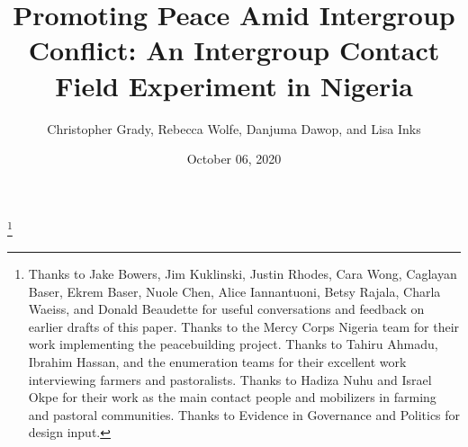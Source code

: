 \documentclass[11pt]{article}
\title{Promoting Peace Amid Intergroup Conflict: An Intergroup Contact
Field Experiment in Nigeria}
\author{\parbox{.7\linewidth}{\centering
Christopher Grady, Rebecca Wolfe, Danjuma Dawop, and Lisa Inks
}
}
\date{October 06, 2020}
\begin{document}
\VerbatimFootnotes

%
%
%
%
%
%
%
%
%
%

\newlength{\cslhangindent}
\setlength{\cslhangindent}{1.5em}
\newenvironment{cslreferences}%
  {\setlength{\parindent}{0pt}%
  \everypar{\setlength{\hangindent}{\cslhangindent}}\ignorespaces}%
  {\par}

\maketitle


\newcommand\blfootnote[1]{%
  \begingroup
  \renewcommand\thefootnote{}\footnote{#1}%
  \addtocounter{footnote}{-1}%
  \endgroup
}
\singlespacing\blfootnote{Thanks to Jake Bowers, Jim Kuklinski, Justin
Rhodes, Cara Wong, Caglayan Baser, Ekrem Baser, Nuole Chen, Alice
Iannantuoni, Betsy Rajala, Charla Waeiss, and Donald Beaudette for
useful conversations and feedback on earlier drafts of this paper.
Thanks to the Mercy Corps Nigeria team for their work implementing the
peacebuilding project. Thanks to Tahiru Ahmadu, Ibrahim Hassan, and the
enumeration teams for their excellent work interviewing farmers and
pastoralists. Thanks to Hadiza Nuhu and Israel Okpe for their work as
the main contact people and mobilizers in farming and pastoral
communities. Thanks to Evidence in Governance and Politics for design
input.}
\end{document}
